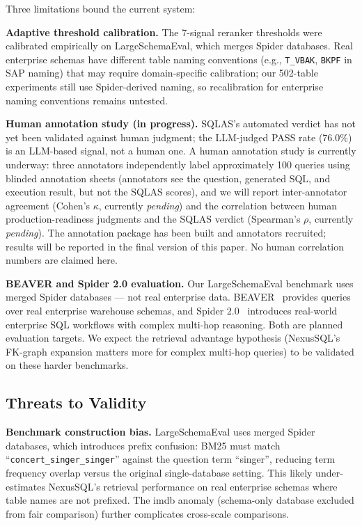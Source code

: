 \documentclass[conference]{IEEEtran}
\newcommand{\humanKappa}{\textit{pending}}
\newcommand{\humanRho}{\textit{pending}}
\begin{document}
Three limitations bound the current system:

\textbf{Adaptive threshold calibration.}
The 7-signal reranker thresholds were calibrated empirically on
LargeSchemaEval, which merges Spider databases. Real enterprise schemas
have different table naming conventions (e.g., \texttt{T\_VBAK},
\texttt{BKPF} in SAP naming) that may require domain-specific
calibration; our 502-table experiments still use Spider-derived
naming, so recalibration for enterprise naming conventions remains
untested.

\textbf{Human annotation study (in progress).}
SQLAS's automated verdict has not yet been validated against human
judgment; the LLM-judged PASS rate (76.0\%) is an LLM-based signal,
not a human one. A human annotation study is currently underway:
three annotators independently label approximately 100 queries using
blinded annotation sheets (annotators see the question, generated SQL,
and execution result, but not the SQLAS scores), and we will report
inter-annotator agreement (Cohen's $\kappa$, currently \humanKappa)
and the correlation between human production-readiness judgments and
the SQLAS verdict (Spearman's $\rho$, currently \humanRho). The
annotation package has been built and annotators recruited; results
will be reported in the final version of this paper. No human
correlation numbers are claimed here.

\textbf{BEAVER and Spider 2.0 evaluation.}
Our LargeSchemaEval benchmark uses merged Spider databases --- not real
enterprise data. BEAVER~\cite{beaver} provides queries over real
enterprise warehouse schemas, and Spider 2.0~\cite{spider2} introduces
real-world enterprise SQL workflows with complex multi-hop reasoning.
Both are planned evaluation targets. We expect the retrieval advantage
hypothesis (NexusSQL's FK-graph expansion matters more for complex
multi-hop queries) to be validated on these harder benchmarks.

\subsection{Threats to Validity}

\textbf{Benchmark construction bias.}
LargeSchemaEval uses merged Spider databases, which introduces prefix
confusion: BM25 must match ``\texttt{concert\_singer\_singer}'' against
the question term ``singer'', reducing term frequency overlap versus
the original single-database setting. This likely under-estimates
NexusSQL's retrieval performance on real enterprise schemas where table
names are not prefixed. The imdb anomaly (schema-only database excluded
from fair comparison) further complicates cross-scale comparisons.
\end{document}
